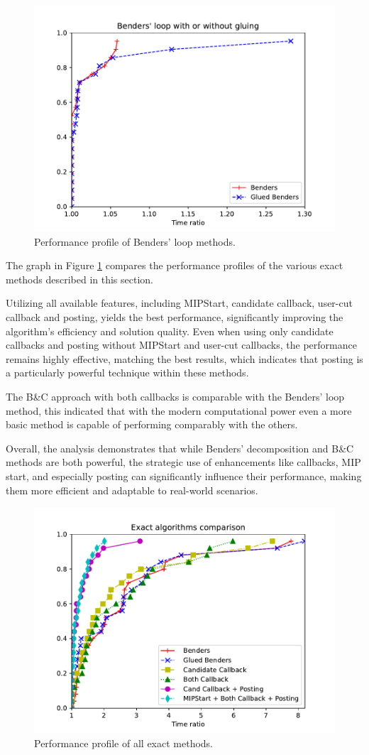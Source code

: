 \begin{figure}[H]
    \centering
    \includegraphics[width=0.7\linewidth]{Immagini/benders.pdf}
    \caption{Performance profile of Benders' loop methods.}
    \label{fig:benders_comp}
\end{figure}

The graph in Figure \ref{fig:benders_comp} compares the performance profiles of the various exact methods described in this section. 

Utilizing all available features, including MIPStart, candidate callback, user-cut callback and posting, yields the best performance, significantly improving the algorithm's efficiency and solution quality. 
Even when using only candidate callbacks and posting without MIPStart and user-cut callbacks, the performance remains highly effective, matching the best results, which indicates that posting is a particularly powerful technique within these methods. 

The B\&C approach with both callbacks is comparable with the Benders' loop method, this indicated that with the modern computational power even a more basic method is capable of performing comparably with the others.

\newpage

Overall, the analysis demonstrates that while Benders' decomposition and B\&C methods are both powerful, the strategic use of enhancements like callbacks, MIP start, and especially posting can significantly influence their performance, making them more efficient and adaptable to real-world scenarios.

\begin{figure}[H]
    \centering
    \includegraphics[width=0.7\linewidth]{Immagini/exacts.pdf}
    \caption{Performance profile of all exact methods.}
    \label{fig:exacts_comp}
\end{figure}